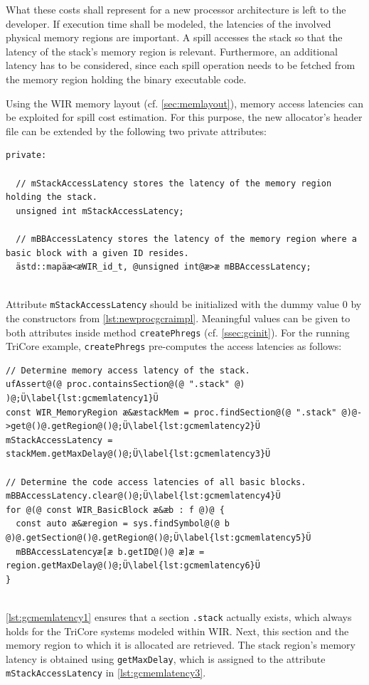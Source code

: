 What these costs shall represent for a new processor architecture is left to the developer.
If execution time shall be modeled, the latencies of the involved physical memory regions are important.
A spill accesses the stack so that the latency of the stack's memory region is relevant.
Furthermore, an additional latency has to be considered, since each spill operation needs to be fetched from the memory region holding the binary executable code.

Using the \gls{WIR} memory layout (cf. \cref{sec:memlayout}), memory access latencies can be exploited for spill cost estimation.
For this purpose, the new allocator's header file can be extended by the following two private attributes: \\
\begin{lstlisting}[style=code,float=!ht,aboveskip=-0.8 \baselineskip,belowskip=-0.8 \baselineskip]
private:

  // mStackAccessLatency stores the latency of the memory region holding the stack.
  unsigned int mStackAccessLatency;

  // mBBAccessLatency stores the latency of the memory region where a basic block with a given ID resides.
  ästd::mapäæ<æWIR_id_t, @unsigned int@æ>æ mBBAccessLatency;
\end{lstlisting}
\\
Attribute \texttt{mStackAccessLatency} should be initialized with the dummy value 0 by the constructors from \cref{lst:newprocgcraimpl}.
Meaningful values can be given to both attributes inside method \texttt{createPhregs} (cf. \cref{ssec:gcinit}).
For the running TriCore example, \texttt{createPhregs} pre-computes the access latencies as follows: \\
\begin{lstlisting}[style=code,float=!ht,aboveskip=-0.8 \baselineskip,belowskip=-0.8 \baselineskip]
// Determine memory access latency of the stack.
ufAssert@(@ proc.containsSection@(@ ".stack" @) )@;Ü\label{lst:gcmemlatency1}Ü
const WIR_MemoryRegion æ&æstackMem = proc.findSection@(@ ".stack" @)@->get@()@.getRegion@()@;Ü\label{lst:gcmemlatency2}Ü
mStackAccessLatency = stackMem.getMaxDelay@()@;Ü\label{lst:gcmemlatency3}Ü

// Determine the code access latencies of all basic blocks.
mBBAccessLatency.clear@()@;Ü\label{lst:gcmemlatency4}Ü
for @(@ const WIR_BasicBlock æ&æb : f @)@ {
  const auto æ&æregion = sys.findSymbol@(@ b @)@.getSection@()@.getRegion@()@;Ü\label{lst:gcmemlatency5}Ü
  mBBAccessLatencyæ[æ b.getID@()@ æ]æ = region.getMaxDelay@()@;Ü\label{lst:gcmemlatency6}Ü
}
\end{lstlisting}
\\
\cref{lst:gcmemlatency1} ensures that a section \texttt{.stack} actually exists, which always holds for the TriCore systems modeled within \gls{WIR}.
Next, this section and the memory region to which it is allocated are retrieved.
The stack region's memory latency is obtained using \texttt{getMaxDelay}, which is assigned to the attribute \texttt{mStackAccessLatency} in \cref{lst:gcmemlatency3}.

